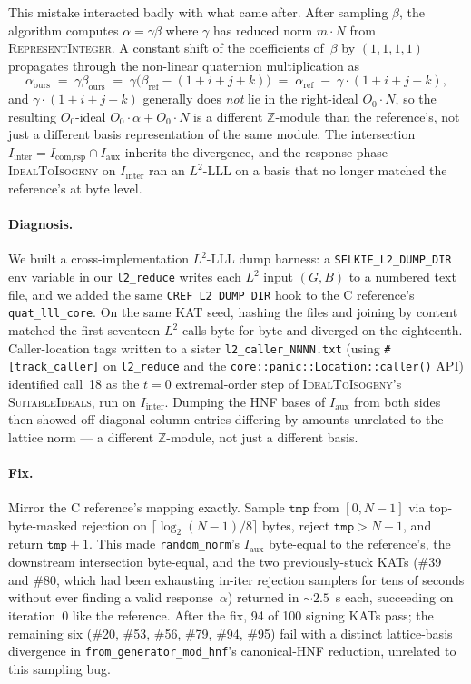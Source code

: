 This mistake interacted badly with what came after.  After
sampling $\beta$, the algorithm computes $\alpha = \gamma\beta$
where $\gamma$ has reduced norm $m \cdot N$ from
\textsc{RepresentInteger}.  A constant shift of the
coefficients of~$\beta$ by $(1, 1, 1, 1)$ propagates through the
non-linear quaternion multiplication as
\[
  \alpha_{\text{ours}}
  \;=\; \gamma\beta_{\text{ours}}
  \;=\; \gamma\bigl(\beta_{\text{ref}} - (1+i+j+k)\bigr)
  \;=\; \alpha_{\text{ref}} \;-\; \gamma\cdot(1+i+j+k),
\]
and $\gamma \cdot (1 + i + j + k)$ generally does \emph{not} lie
in the right-ideal $O_0 \cdot N$, so the resulting
$O_0$-ideal $O_0 \cdot \alpha + O_0 \cdot N$ is a different
$\mathbb{Z}$-module than the reference's, not just a different
basis representation of the same module.  The intersection
$I_{\text{inter}} = I_{\text{com,rsp}} \cap I_{\text{aux}}$
inherits the divergence, and the response-phase
\textsc{IdealToIsogeny} on $I_{\text{inter}}$ ran an
$L^2$-LLL on a basis that no longer matched the reference's at
byte level.

\paragraph{Diagnosis.}  We built a cross-implementation
$L^2$-LLL dump harness: a \texttt{SELKIE\_L2\_DUMP\_DIR} env
variable in our \texttt{l2\_reduce} writes each $L^2$ input
$(G, B)$ to a numbered text file, and we added the same
\texttt{CREF\_L2\_DUMP\_DIR} hook to the C reference's
\texttt{quat\_lll\_core}.  On the same KAT seed, hashing the
files and joining by content matched the first seventeen
$L^2$ calls byte-for-byte and diverged on the eighteenth.
Caller-location tags written to a sister
\texttt{l2\_caller\_NNNN.txt} (using
\texttt{\#[track\_caller]} on \texttt{l2\_reduce} and the
\texttt{core::panic::Location::caller()} API) identified call~18
as the $t=0$ extremal-order step of
\textsc{IdealToIsogeny}'s \textsc{SuitableIdeals}, run on
$I_{\text{inter}}$.  Dumping the HNF bases of
$I_{\text{aux}}$ from both sides then showed off-diagonal
column entries differing by amounts unrelated to the lattice
norm --- a different $\mathbb{Z}$-module, not just a different
basis.

\paragraph{Fix.}  Mirror the C reference's mapping exactly.
Sample $\mathtt{tmp}$ from $[0, N-1]$ via top-byte-masked
rejection on $\lceil \log_2(N-1) / 8 \rceil$ bytes, reject
$\mathtt{tmp} > N - 1$, and return $\mathtt{tmp} + 1$.  This
made \texttt{random\_norm}'s $I_{\text{aux}}$ byte-equal to the
reference's, the downstream intersection byte-equal, and the
two previously-stuck KATs (\#39 and \#80, which had been
exhausting in-iter rejection samplers for tens of seconds
without ever finding a valid response~$\alpha$) returned in
$\sim 2.5$~s each, succeeding on iteration~0 like the
reference.  After the fix, 94 of 100 signing KATs pass; the
remaining six (\#20, \#53, \#56, \#79, \#94, \#95) fail with a
distinct lattice-basis divergence in
\texttt{from\_generator\_mod\_hnf}'s canonical-HNF reduction,
unrelated to this sampling bug.


